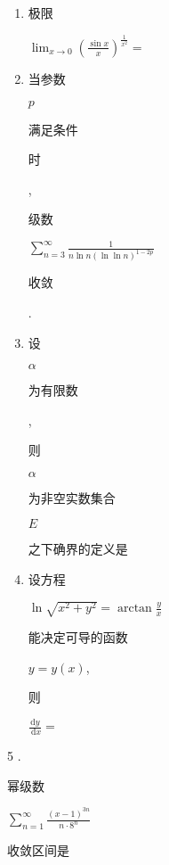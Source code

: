 \documentclass[10pt]{article}
\begin{document}
\begin{enumerate}
  \item \begin{CJK}{UTF8}{mj}极限\end{CJK} $\lim _{x \rightarrow 0}\left(\frac{\sin x}{x}\right)^{\frac{1}{x^{2}}}=$

  \item \begin{CJK}{UTF8}{mj}当参数\end{CJK} $p$ \begin{CJK}{UTF8}{mj}满足条件\end{CJK} \begin{CJK}{UTF8}{mj}时\end{CJK}, \begin{CJK}{UTF8}{mj}级数\end{CJK} $\sum_{n=3}^{\infty} \frac{1}{n \ln n(\ln \ln n)^{1-2 p}}$ \begin{CJK}{UTF8}{mj}收敛\end{CJK}.

  \item \begin{CJK}{UTF8}{mj}设\end{CJK} $\alpha$ \begin{CJK}{UTF8}{mj}为有限数\end{CJK}, \begin{CJK}{UTF8}{mj}则\end{CJK} $\alpha$ \begin{CJK}{UTF8}{mj}为非空实数集合\end{CJK} $E$ \begin{CJK}{UTF8}{mj}之下确界的定义是\end{CJK}

  \item \begin{CJK}{UTF8}{mj}设方程\end{CJK} $\ln \sqrt{x^{2}+y^{2}}=\arctan \frac{y}{x}$ \begin{CJK}{UTF8}{mj}能决定可导的函数\end{CJK} $y=y(x)$, \begin{CJK}{UTF8}{mj}则\end{CJK} $\frac{\mathrm{d} y}{\mathrm{~d} x}=$

\end{enumerate}
5 . \begin{CJK}{UTF8}{mj}幂级数\end{CJK} $\sum_{n=1}^{\infty} \frac{(x-1)^{3 n}}{n \cdot 8^{n}}$ \begin{CJK}{UTF8}{mj}收敛区间是\end{CJK}
\end{document}
